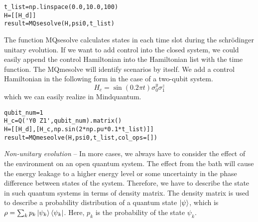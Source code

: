 \begin{lstlisting}
t_list=np.linspace(0.0,10.0,100)
H=[[H_d]]
result=MQsesolve(H,psi0,t_list)
\end{lstlisting}
The function MQsesolve calculates states in each time slot during the schrödinger unitary evolution. If we want to add control into the closed system, we could easily append the control Hamiltonian into the Hamiltonian list with the time function. The MQmesolve will identify scenarios by itself. We add a control Hamiltonian in the following form in the case of a two-qubit system.
\begin{equation}
    H_{c}=\sin(0.2\pi t)\sigma_{0}^{y}\sigma_{1}^{z}
\end{equation}
which we can easily realize in Mindquantum.
\begin{lstlisting}
qubit_num=1
H_c=Q('Y0 Z1',qubit_num).matrix()
H=[[H_d],[H_c,np.sin(2*np.pu*0.1*t_list)]]
result=MQmeseolve(H,psi0,t_list,col_ops=[])
\end{lstlisting}
\textit{Non-unitary evolution} -- In more cases, we always have to consider the effect of the environment on an open quantum system. The effect from the bath will cause the energy leakage to a higher energy level or some uncertainty in the phase difference between states of the system. Therefore, we have to describe the state in such quantum systems in terms of density matrix. The density matrix is used to describe a probability distribution of a quantum state $\ket{\psi}$, which is $\rho=\sum_{k}p_{k}\ket{\psi_{k}}\bra{\psi_{k}}$. Here, $p_k$ is the probability of the state $\psi_k$.

